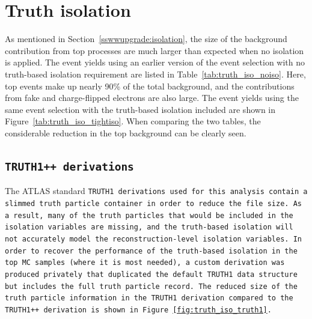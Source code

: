 \section{Truth isolation}\label{app:truth_isolation}
As mentioned in Section~\ref{sswwupgrade:isolation}, the size of the background contribution from top processes are much larger than expected when no isolation is applied.
The event yields using an earlier version of the event selection with no truth-based isolation requirement are listed in Table~\ref{tab:truth_iso_noiso}.
Here, top events make up nearly 90\% of the total background, and the contributions from fake and charge-flipped electrons are also large.
The event yields using the same event selection with the truth-based isolation included are shown in Figure~\ref{tab:truth_iso_tightiso}.
When comparing the two tables, the considerable reduction in the top background can be clearly seen.



\FloatBarrier

\subsection{\tt{TRUTH1++} derivations}
The ATLAS standard \tt{TRUTH1} derivations used for this analysis contain a slimmed truth particle container in order to reduce the file size.
As a result, many of the truth particles that would be included in the isolation variables are missing, and the truth-based isolation will not accurately model the reconstruction-level isolation variables.
In order to recover the performance of the truth-based isolation in the top MC samples (where it is most needed), a custom derivation was produced privately that duplicated the default \tt{TRUTH1} data structure but includes the full truth particle record.
The reduced size of the truth particle information in the \tt{TRUTH1} derivation compared to the \tt{TRUTH1++} derivation is shown in Figure~\ref{fig:truth_iso_truth1}.

